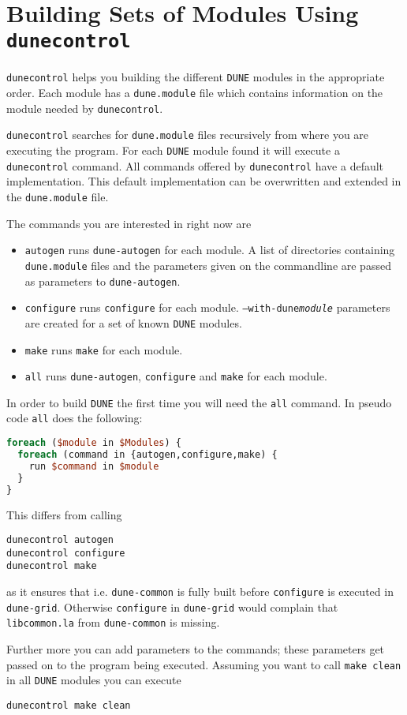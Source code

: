 \documentclass[11pt,a4paper,headinclude,footinclude,DIV16,normalheadings]{scrartcl}
\newcommand{\dune}{\texttt{DUNE}\xspace}
\newcommand{\autogen}{\texttt{dune-autogen}\xspace}
\newcommand{\configure}{\texttt{configure}\xspace}
\newcommand{\dunecommon}{\texttt{dune-common}\xspace}
\newcommand{\dunegrid}{\texttt{dune-grid}\xspace}
\newcommand{\dunecontrol}{\texttt{dunecontrol}\xspace}
\newcommand{\dunemodule}{\texttt{dune.module}\xspace}
\newcommand{\make}{\texttt{make}\xspace}
\begin{document}
\section{Building Sets of Modules Using \dunecontrol}
\label{dunecontrol}
\dunecontrol helps you building the different \dune modules in the
appropriate order. Each module has a \dunemodule file which contains
information on the module needed by \dunecontrol. 

\dunecontrol searches for \dunemodule files recursively from where you
are executing the program. For each \dune module found it will execute
a \dunecontrol command. All commands offered by \dunecontrol have a
default implementation. This default implementation can be overwritten
and extended in the \dunemodule file.

The commands you are interested in right now are
\begin{itemize}
\item \texttt{autogen} runs \autogen for each module. A list of
  directories containing \dunemodule files and the parameters given on
  the commandline are passed as parameters to \autogen.
\item \texttt{configure} runs \configure for each
  module. \texttt{--with-dune\textit{module}} parameters are created
  for a set of known \dune modules.
\item \texttt{make} runs \make for each module.
\item \texttt{all} runs \autogen, \configure and \make for each module.
\end{itemize}

In order to build \dune the first time you will need the \texttt{all}
command. In pseudo code \texttt{all} does the following:
\begin{lstlisting}[language=Perl]
foreach ($module in $Modules) {
  foreach (command in {autogen,configure,make) {
    run $command in $module
  }
}
\end{lstlisting}

This differs from calling
\begin{lstlisting}
dunecontrol autogen
dunecontrol configure
dunecontrol make
\end{lstlisting}
as it ensures that i.e. \dunecommon is fully built before \configure
is executed in \dunegrid. Otherwise \configure in \dunegrid would
complain that \texttt{libcommon.la} from \dunecommon is missing.

Further more you can add parameters to the commands; these parameters
get passed on to the program being executed. Assuming you want to call
\texttt{make clean} in all \dune modules you can execute
\begin{lstlisting}
dunecontrol make clean
\end{lstlisting}
\end{document}
